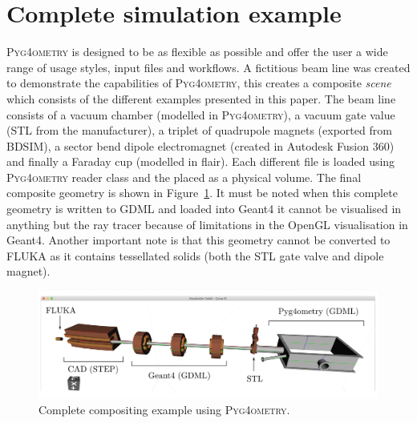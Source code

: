 \documentclass[final,5p,times,twocolumn]{elsarticle}
\newcommand{\PYGEOMETRY}{\textsc{Pyg4ometry}}
\begin{document}
\section{Complete simulation example}
\PYGEOMETRY{} is designed to be as flexible as possible and offer the user a wide range of usage styles, input files 
and workflows. A fictitious beam line was created to demonstrate the capabilities of \PYGEOMETRY, this creates a composite 
\emph{scene} which consists of the different examples presented in this paper. The beam line consists of a vacuum chamber 
(modelled in \PYGEOMETRY{}), a vacuum gate value (STL from the manufacturer), a triplet of quadrupole magnets (exported 
from BDSIM), a sector bend dipole electromagnet (created in Autodesk Fusion 360) and finally a Faraday cup (modelled in 
flair). Each different file is loaded using \PYGEOMETRY{} reader class and the placed as a physical volume. The final composite 
geometry is shown in Figure~\ref{fig:model}. It must be noted when this complete geometry is written to GDML and loaded into 
Geant4 it cannot be visualised in anything but the ray tracer because of limitations in the OpenGL visualisation in Geant4. Another 
important note is that this geometry cannot be converted to FLUKA as it contains tessellated solids (both the STL gate valve and
dipole magnet). 
%
\begin{figure}
\begin{center}
\includegraphics[width=1.0\textwidth]{./model-scene/model.pdf}
\caption{Complete compositing example using \PYGEOMETRY{}.}
\label{fig:model}
\end{center}
\end{figure}
\end{document}

